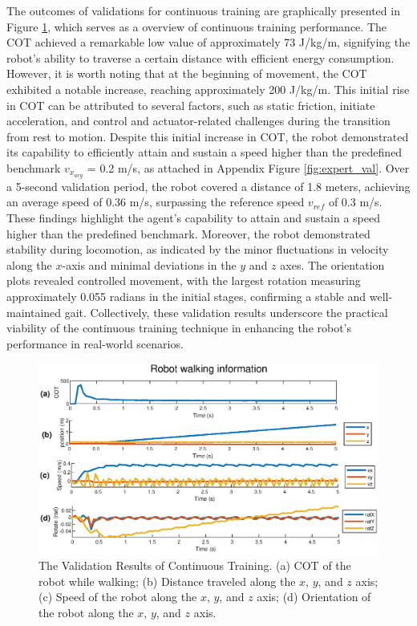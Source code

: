 The outcomes of validations for continuous training are graphically presented in Figure \ref{fig:CT}, which serves as a overview of continuous training performance. The COT achieved a remarkable low value of approximately 73 J/kg/m, signifying the robot's ability to traverse a certain distance with efficient energy consumption. However, it is worth noting that at the beginning of movement, the COT exhibited a notable increase, reaching approximately 200 J/kg/m. This initial rise in COT can be attributed to several factors, such as static friction, initiate acceleration, and control and actuator-related challenges during the transition from rest to motion. Despite this initial increase in COT, the robot demonstrated its capability to efficiently attain and sustain a speed higher than the predefined benchmark $v_{x_{avg}}$ = 0.2 m/s, as attached in Appendix Figure \ref{fig:expert_val}. Over a 5-second validation period, the robot covered a distance of 1.8 meters, achieving an average speed of 0.36 m/s, surpassing the reference speed $v_{ref}$ of 0.3 m/s. These findings highlight the agent's capability to attain and sustain a speed higher than the predefined benchmark. Moreover, the robot demonstrated stability during locomotion, as indicated by the minor fluctuations in velocity along the $x$-axis and minimal deviations in the $y$ and $z$ axes. The orientation plots revealed controlled movement, with the largest rotation measuring approximately 0.055 radians in the initial stages, confirming a stable and well-maintained gait. Collectively, these validation results underscore the practical viability of the continuous training technique in enhancing the robot's performance in real-world scenarios.

\begin{figure}[htb]
    \centering
    \includegraphics[width=0.9\linewidth]{img/chap5/best_CL.eps}
    \caption{The Validation Results of Continuous Training. (a) COT of the robot while walking; (b) Distance traveled along the $x$, $y$, and $z$ axis; (c) Speed of the robot along the $x$, $y$, and $z$ axis; (d) Orientation of the robot along the $x$, $y$, and $z$ axis.}
    \label{fig:CT}
\end{figure}


